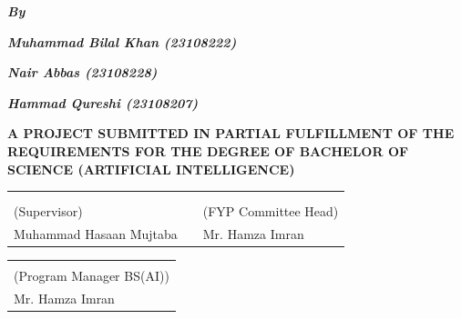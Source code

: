 \singlespacing

\newpage
\thispagestyle{empty}

\begin{center}
   \Huge \textbf{\projecttitle}
\end{center}

\par\bigskip
\centerline{\textbf{\textit{\Large By}}}
\par\bigskip
\centerline{\textbf{\textit{\large Muhammad Bilal Khan (23108222)}}}
\centerline{\textbf{\textit{\large Nair Abbas (23108228)}}}
\centerline{\textbf{\textit{\large Hammad Qureshi (23108207)}}}
\par\bigskip

\par\bigskip
\par\bigskip

\begin{center}
\normalsize\textbf{A PROJECT SUBMITTED IN PARTIAL FULFILLMENT OF THE REQUIREMENTS FOR THE DEGREE OF BACHELOR OF SCIENCE (ARTIFICIAL INTELLIGENCE)}
\end{center}

\par\bigskip
\vspace{42pt}

\vspace{18pt}
\begin{table}[!ht]
    \centering
    \begin{tabular}{C{0.4\textwidth} C{0.1\textwidth} C{0.4\textwidth}}
         &  &  \\  
         &  &  \\
        (Supervisor) &  & (FYP Committee Head)\\
        Muhammad Hasaan Mujtaba &  &  Mr. Hamza Imran \\
    \end{tabular}
\end{table}
\par\bigskip
\par\bigskip
\vspace{18pt}

\vspace{18pt}
\begin{table}[!ht]
   \centering
   \begin{tabular}{C{0.4\textwidth}}
       \\ 
       \\
       (Program Manager BS(AI)) \\
       Mr. Hamza Imran \\
   \end{tabular}
\end{table}

